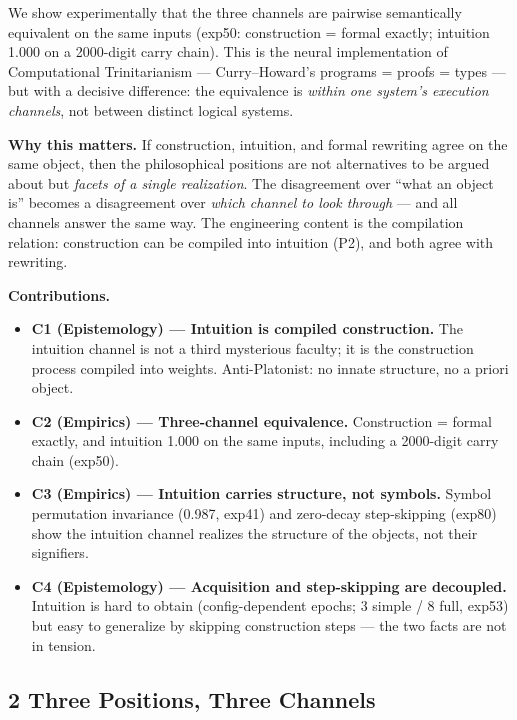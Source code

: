 \documentclass[
]{article}
\providecommand{\tightlist}{%
  \setlength{\itemsep}{0pt}\setlength{\parskip}{0pt}}
\begin{document}
We show experimentally that the three channels are pairwise semantically
equivalent on the same inputs (exp50: construction = formal exactly;
intuition 1.000 on a 2000-digit carry chain). This is the neural
implementation of Computational Trinitarianism --- Curry--Howard's
programs = proofs = types --- but with a decisive difference: the
equivalence is \emph{within one system's execution channels}, not
between distinct logical systems.

\textbf{Why this matters.} If construction, intuition, and formal
rewriting agree on the same object, then the philosophical positions are
not alternatives to be argued about but \emph{facets of a single
realization}. The disagreement over ``what an object is'' becomes a
disagreement over \emph{which channel to look through} --- and all
channels answer the same way. The engineering content is the compilation
relation: construction can be compiled into intuition (P2), and both
agree with rewriting.

\textbf{Contributions.}

\begin{itemize}
\tightlist
\item
  \textbf{C1 (Epistemology) --- Intuition is compiled construction.} The
  intuition channel is not a third mysterious faculty; it is the
  construction process compiled into weights. Anti-Platonist: no innate
  structure, no a priori object.
\item
  \textbf{C2 (Empirics) --- Three-channel equivalence.} Construction =
  formal exactly, and intuition 1.000 on the same inputs, including a
  2000-digit carry chain (exp50).
\item
  \textbf{C3 (Empirics) --- Intuition carries structure, not symbols.}
  Symbol permutation invariance (0.987, exp41) and zero-decay
  step-skipping (exp80) show the intuition channel realizes the
  structure of the objects, not their signifiers.
\item
  \textbf{C4 (Epistemology) --- Acquisition and step-skipping are
  decoupled.} Intuition is hard to obtain (config-dependent epochs; 3
  simple / 8 full, exp53) but easy to generalize by skipping
  construction steps --- the two facts are not in tension.
\end{itemize}

\subsection{2 Three Positions, Three
Channels}\label{three-positions-three-channels}
\end{document}
